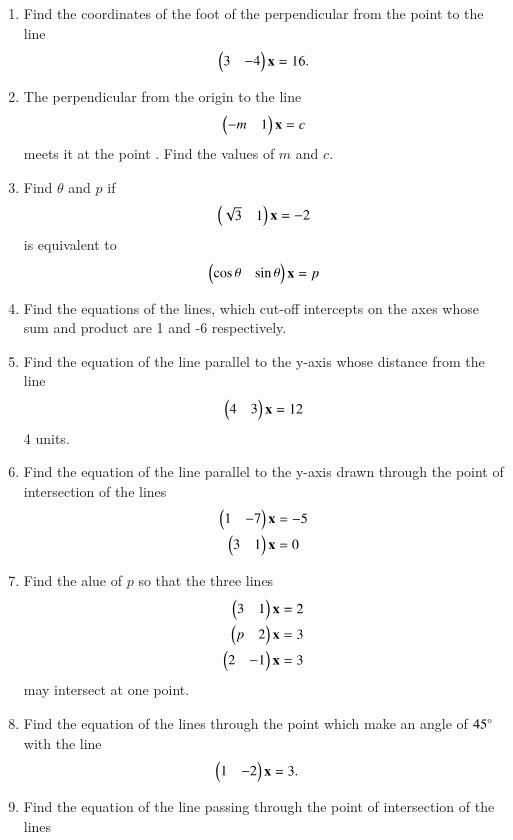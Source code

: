\begin{enumerate}[label=\arabic*.,ref=\thesubsection.\theenumi]
\item Find the coordinates of the foot of the perpendicular from the point  to the line
%
\begin{align}
\begin{pmatrix}3 & -4\end{pmatrix}\mathbf{x} = 16.
\end{align}
%
\item The perpendicular from the origin to the line
\begin{align}
\begin{pmatrix}-m & 1\end{pmatrix}\mathbf{x} = c
\end{align}
%
meets it at the point .  Find the values of $m$ and $c$.
\item Find $\theta$ and $p$ if 
%
\begin{align}
\begin{pmatrix}\sqrt{3} & 1\end{pmatrix}\mathbf{x} = -2
\end{align}
%
is equivalent to
%
\begin{align}
\begin{pmatrix}\cos\theta & \sin\theta\end{pmatrix}\mathbf{x} = p
\end{align}
%
\item Find the equations of the lines, which cut-off intercepts on the axes whose sum and product are 1 and -6 respectively.
%
\item Find the equation of the line parallel to the y-axis whose distance from the line 
%
\begin{align}
\begin{pmatrix}4 & 3\end{pmatrix}\mathbf{x} = 12
\end{align}
%
4 units.
%
\item Find the equation of the line parallel to the y-axis drawn through the point of intersection of the lines 
%
\begin{align}
\begin{pmatrix}1 & -7\end{pmatrix}\mathbf{x} &= -5
\\
\begin{pmatrix}3 & 1\end{pmatrix}\mathbf{x} &= 0
\end{align}
%
\item Find the alue of $p$ so that the three lines 
%
\begin{align}
\begin{pmatrix}3 & 1\end{pmatrix}\mathbf{x} &= 2
\\
\begin{pmatrix}p & 2\end{pmatrix}\mathbf{x} &= 3
\\
\begin{pmatrix}2 & -1\end{pmatrix}\mathbf{x} &= 3
\end{align}
%
may intersect at one point.
%
\item Find the equation of the lines through the point  which make an angle of $45\degree$ with the line 
\begin{align}
\begin{pmatrix}1 & -2\end{pmatrix}\mathbf{x} &= 3.
\end{align}
%
\item Find the equation of the line passing through the point of intersection of the lines 

\end{enumerate}
